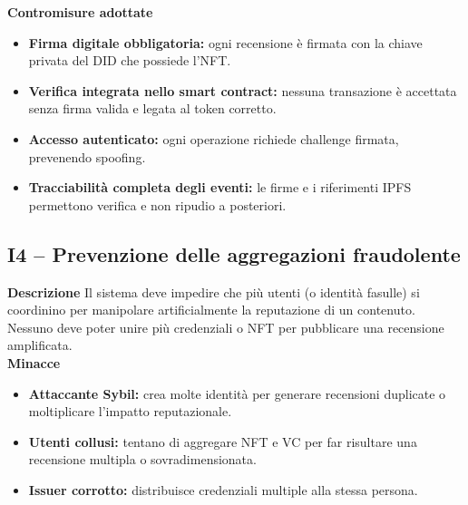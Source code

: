             \noindent \textbf{Contromisure adottate}
                \begin{itemize}
                    \item \textbf{Firma digitale obbligatoria:} ogni recensione è firmata con la chiave privata del DID che possiede l’NFT.

                    \item \textbf{Verifica integrata nello smart contract:} nessuna transazione è accettata senza firma valida e legata al token corretto.

                    \item \textbf{Accesso autenticato:} ogni operazione richiede challenge firmata, prevenendo spoofing.

                    \item \textbf{Tracciabilità completa degli eventi:} le firme e i riferimenti IPFS permettono verifica e non ripudio a posteriori.
                \end{itemize}

        \subsection{I4 – Prevenzione delle aggregazioni fraudolente}
            \noindent \textbf{Descrizione}
                Il sistema deve impedire che più utenti (o identità fasulle) si coordinino per manipolare artificialmente la reputazione di un contenuto. Nessuno deve poter unire più credenziali o NFT per pubblicare una recensione amplificata. \\

            \noindent \textbf{Minacce}
                \begin{itemize}
                    \item \textbf{Attaccante Sybil:} crea molte identità per generare recensioni duplicate o moltiplicare l'impatto reputazionale.

                    \item \textbf{Utenti collusi:} tentano di aggregare NFT e VC per far risultare una recensione multipla o sovradimensionata.

                    \item \textbf{Issuer corrotto:} distribuisce credenziali multiple alla stessa persona.
                \end{itemize}

